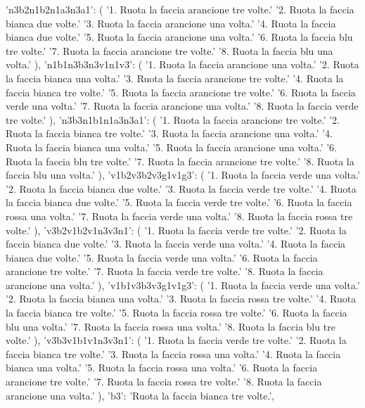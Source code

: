 {{        'n3b2n1b2n1a3n3a1': (
            '1. Ruota la faccia arancione tre volte.\n'
            '2. Ruota la faccia bianca due volte.\n'
            '3. Ruota la faccia arancione una volta.\n'
            '4. Ruota la faccia bianca due volte.\n'
            '5. Ruota la faccia arancione una volta.\n'
            '6. Ruota la faccia blu tre volte.\n'
            '7. Ruota la faccia arancione tre volte.\n'
            '8. Ruota la faccia blu una volta.'
        ),
        'n1b1n3b3n3v1n1v3': (
            '1. Ruota la faccia arancione una volta.\n'
            '2. Ruota la faccia bianca una volta.\n'
            '3. Ruota la faccia arancione tre volte.\n'
            '4. Ruota la faccia bianca tre volte.\n'
            '5. Ruota la faccia arancione tre volte.\n'
            '6. Ruota la faccia verde una volta.\n'
            '7. Ruota la faccia arancione una volta.\n'
            '8. Ruota la faccia verde tre volte.'
        ),
        'n3b3n1b1n1a3n3a1': (
            '1. Ruota la faccia arancione tre volte.\n'
            '2. Ruota la faccia bianca tre volte.\n'
            '3. Ruota la faccia arancione una volta.\n'
            '4. Ruota la faccia bianca una volta.\n'
            '5. Ruota la faccia arancione una volta.\n'
            '6. Ruota la faccia blu tre volte.\n'
            '7. Ruota la faccia arancione tre volte.\n'
            '8. Ruota la faccia blu una volta.'
        ),
        'v1b2v3b2v3g1v1g3': (
            '1. Ruota la faccia verde una volta.\n'
            '2. Ruota la faccia bianca due volte.\n'
            '3. Ruota la faccia verde tre volte.\n'
            '4. Ruota la faccia bianca due volte.\n'
            '5. Ruota la faccia verde tre volte.\n'
            '6. Ruota la faccia rossa una volta.\n'
            '7. Ruota la faccia verde una volta.\n'
            '8. Ruota la faccia rossa tre volte.'
        ),
        'v3b2v1b2v1n3v3n1': (
            '1. Ruota la faccia verde tre volte.\n'
            '2. Ruota la faccia bianca due volte.\n'
            '3. Ruota la faccia verde una volta.\n'
            '4. Ruota la faccia bianca due volte.\n'
            '5. Ruota la faccia verde una volta.\n'
            '6. Ruota la faccia arancione tre volte.\n'
            '7. Ruota la faccia verde tre volte.\n'
            '8. Ruota la faccia arancione una volta.'
        ),
        'v1b1v3b3v3g1v1g3': (
            '1. Ruota la faccia verde una volta.\n'
            '2. Ruota la faccia bianca una volta.\n'
            '3. Ruota la faccia rossa tre volte.\n'
            '4. Ruota la faccia bianca tre volte.\n'
            '5. Ruota la faccia rossa tre volte.\n'
            '6. Ruota la faccia blu una volta.\n'
            '7. Ruota la faccia rossa una volta.\n'
            '8. Ruota la faccia blu tre volte.'
        ),
        'v3b3v1b1v1n3v3n1': (
            '1. Ruota la faccia verde tre volte.\n'
            '2. Ruota la faccia bianca tre volte.\n'
            '3. Ruota la faccia rossa una volta.\n'
            '4. Ruota la faccia bianca una volta.\n'
            '5. Ruota la faccia rossa una volta.\n'
            '6. Ruota la faccia arancione tre volte.\n'
            '7. Ruota la faccia rossa tre volte.\n'
            '8. Ruota la faccia arancione una volta.'
        ),
        'b3': 'Ruota la faccia bianca tre volte.',

}}
